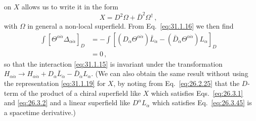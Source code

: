 on \(X\) allows us to write it in the form
\begin{equation}
  X=D^2\Omega+\bar D^2\Omega^\dagger\,,
  \tag{31.1.19}\label{eq:31.1.19}
\end{equation}
with \(\Omega\) in general a non-local superfield. From
Eq.~\eqref{eq:31.1.16} we then find
\[
  \begin{aligned}
  \int[\Theta^{\alpha\dot\alpha}\Delta_{\alpha\dot\alpha}]_D
  &=-\int\left[
    (D_\alpha\Theta^{\alpha\dot\alpha})\bar L_{\dot\alpha}
    -(\bar D_{\dot\alpha}\Theta^{\alpha\dot\alpha})L_\alpha
  \right]_D\\
  &=0\,,
  \end{aligned}
\]
so that the interaction \eqref{eq:31.1.15} is invariant under the
transformation
\(H_{\alpha\dot\alpha}\to H_{\alpha\dot\alpha}
+D_\alpha\bar L_{\dot\alpha}-\bar D_{\dot\alpha}L_\alpha\). (We can also obtain the same
result without using the representation \eqref{eq:31.1.19} for \(X\), by
noting from Eq.~\eqref{eq:26.2.25} that the \(D\)-term of the product of a
chiral superfield like \(X\) which satisfies Eqs.~\eqref{eq:26.3.1} and
\eqref{eq:26.3.2} and a linear superfield like
\(D^\alpha L_\alpha\) which satisfies Eq.~\eqref{eq:26.3.45} is a spacetime
derivative.)

